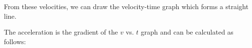           
          
        \par 
        \label{m38795*id72478}From these velocities, we can draw the velocity-time graph which forms a straight line.\par 
        \label{m38795*id72482}The acceleration is the gradient of the \begin{math}v\end{math} vs. \begin{math}t\end{math} graph and can be calculated as follows:\par 
        \label{m38795*id72504}\nopagebreak\noindent{}
